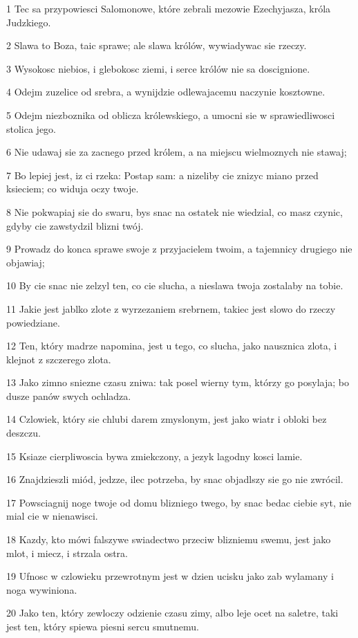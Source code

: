 \par 1 Tec sa przypowiesci Salomonowe, które zebrali mezowie Ezechyjasza, króla Judzkiego.
\par 2 Slawa to Boza, taic sprawe; ale slawa królów, wywiadywac sie rzeczy.
\par 3 Wysokosc niebios, i glebokosc ziemi, i serce królów nie sa doscignione.
\par 4 Odejm zuzelice od srebra, a wynijdzie odlewajacemu naczynie kosztowne.
\par 5 Odejm niezboznika od oblicza królewskiego, a umocni sie w sprawiedliwosci stolica jego.
\par 6 Nie udawaj sie za zacnego przed królem, a na miejscu wielmoznych nie stawaj;
\par 7 Bo lepiej jest, iz ci rzeka: Postap sam: a nizeliby cie znizyc miano przed ksieciem; co widuja oczy twoje.
\par 8 Nie pokwapiaj sie do swaru, bys snac na ostatek nie wiedzial, co masz czynic, gdyby cie zawstydzil blizni twój.
\par 9 Prowadz do konca sprawe swoje z przyjacielem twoim, a tajemnicy drugiego nie objawiaj;
\par 10 By cie snac nie zelzyl ten, co cie slucha, a nieslawa twoja zostalaby na tobie.
\par 11 Jakie jest jablko zlote z wyrzezaniem srebrnem, takiec jest slowo do rzeczy powiedziane.
\par 12 Ten, który madrze napomina, jest u tego, co slucha, jako nausznica zlota, i klejnot z szczerego zlota.
\par 13 Jako zimno sniezne czasu zniwa: tak posel wierny tym, którzy go posylaja; bo dusze panów swych ochladza.
\par 14 Czlowiek, który sie chlubi darem zmyslonym, jest jako wiatr i obloki bez deszczu.
\par 15 Ksiaze cierpliwoscia bywa zmiekczony, a jezyk lagodny kosci lamie.
\par 16 Znajdzieszli miód, jedzze, ilec potrzeba, by snac objadlszy sie go nie zwrócil.
\par 17 Powsciagnij noge twoje od domu blizniego twego, by snac bedac ciebie syt, nie mial cie w nienawisci.
\par 18 Kazdy, kto mówi falszywe swiadectwo przeciw blizniemu swemu, jest jako mlot, i miecz, i strzala ostra.
\par 19 Ufnosc w czlowieku przewrotnym jest w dzien ucisku jako zab wylamany i noga wywiniona.
\par 20 Jako ten, który zewloczy odzienie czasu zimy, albo leje ocet na saletre, taki jest ten, który spiewa piesni sercu smutnemu.
